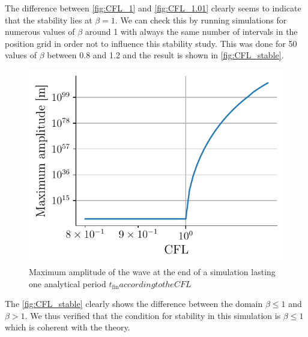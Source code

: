 The difference between \autoref{fig:CFL_1} and \autoref{fig:CFL_1.01} clearly seems to indicate that the stability lies at $\beta = 1$. We can check this by running simulations for numerous values of $\beta$ around 1 with always the same number of intervals in the position grid in order not to influence this stability study. This was done for 50 values of $\beta$ between 0.8 and 1.2 and the result is shown in \autoref{fig:CFL_stable}.
\begin{figure}[h]
    \centering
    \includegraphics[width=0.6\linewidth]{figures/bassin_default_CFL_stability.pdf}
    \caption{Maximum amplitude of the wave at the end of a simulation lasting one analytical period $t_\mathrm{fin} according to the CFL$}
    \label{fig:CFL_stable}
\end{figure}
The \autoref{fig:CFL_stable} clearly shows the difference between the domain $\beta \leq 1$ and $\beta > 1$. We thus verified that the condition for stability in this simulation is $\beta \leq 1$ which is coherent with the theory.


